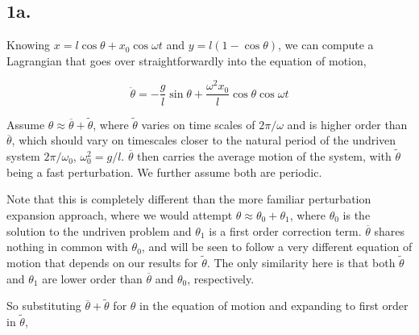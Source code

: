 \documentclass[12pt]{article}
\begin{document}
\newcommand{\tb}{\overline{\theta}}
\newcommand{\tti}{\tilde{\theta}}
\newcommand{\dtb}{\dot{\overline{\theta}}}
\newcommand{\dtti}{\dot{\tilde{\theta}}}
\newcommand{\ddtb}{\ddot{\overline{\theta}}}
\newcommand{\ddtti}{\ddot{\tilde{\theta}}}

\newcommand{\pb}{\overline{\varphi}}
\newcommand{\pti}{\tilde{\varphi}}
\newcommand{\dpb}{\dot{\overline{\varphi}}}
\newcommand{\dpti}{\dot{\tilde{\varphi}}}
\newcommand{\ddpb}{\ddot{\overline{\varphi}}}
\newcommand{\ddpti}{\ddot{\tilde{\varphi}}}

\newcommand{\coswt}{\cos\omega t}
\newcommand{\sinwt}{\sin\omega t}

\newcommand{\wn}{\omega_0}

\newcommand{\average}[2]{ \left\langle\ #1 \right\rangle_#2  }

\newcommand{\ueff}{u_{\textit{eff}}}

\subsection*{1a.}

Knowing \(x=l\cos\theta + x_{0}\cos\omega t\) and \(y = l(1-\cos\theta)\), we can compute a Lagrangian that goes over straightforwardly into the equation of motion,

\[\ddot{\theta} = -\frac{g}{l}\sin\theta + \frac{\omega^2x_0}{l}\cos\theta\cos\omega t
\]

Assume \(\theta\approx\tb+\tti\), where \(\tti\) varies on time scales of \(2\pi/\omega\) and is higher order than \(\tb\), which should vary on timescales closer to the natural period of the undriven system \( 2\pi/\wn\), \( \wn^2=g/l  \). \(\tb\) then carries the average motion of the system, with \(\tti\) being a fast perturbation. We further assume both are periodic.

Note that this is completely different than the more familiar perturbation expansion approach, where we would attempt \(\theta \approx \theta_0 + \theta_1\), where \(\theta_0\) is the solution to the undriven problem and \( \theta _1\) is a first order correction term. \(\tb\) shares nothing in common with \(\theta_0\), and will be seen to follow a very different equation of motion that depends on our results for \(\tti\). The only similarity here is that both \(\tti\) and \(\theta_1\) are lower order than \(\tb\) and \(\theta_0\), respectively.

So substituting \(\tb+\tti\) for \(\theta\) in the equation of motion and expanding to first order in \(\tti\),
\end{document}
